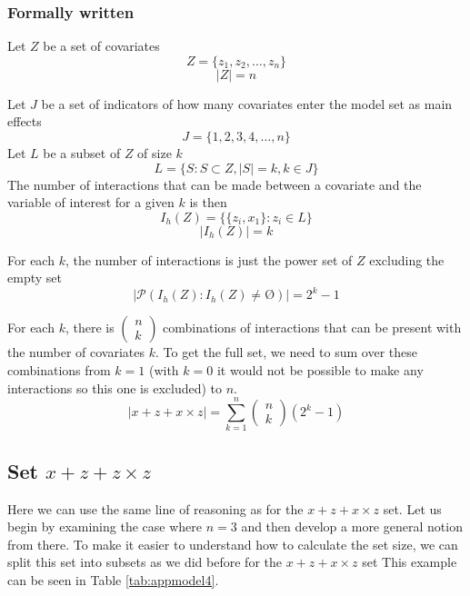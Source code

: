 \subsubsection{Formally written}
Let $Z$ be a set of covariates 
\[Z=\{\left.z_1,z_2,\dots ,z_n\right.\}\] \[|Z|=n\] 

Let $J$ be a set of indicators of how many covariates enter the model set as main effects
\[J=\{\left.1,2,3,4,\dots ,n\right.\}\] 
Let $L$ be a subset of $Z$ of size $k$
\[L=\{\left.S:S\subset Z,\left|S\right|=k,k\in J\right.\}\] 
The number of interactions that can be made between a covariate and the variable of interest for a given $k$ is then
\[I_h\left(Z\right)=\{\{\left.\left.z_i,x_1\right.\}:z_i\in L\right.\}\] 
\[\left|I_h\left(Z\right)\right|=k\] 

For each $k$, the number of interactions is just the power set of $Z$ excluding the empty set
\[\left|\mathcal{P}\left(I_h\left(Z\right):I_h\left(Z\right)\neq \textrm{\O}\right)\right|=2^k-1\] 

For each $k$, there is $\left( \begin{array}{c}
n \\ 
k \end{array}
\right)$ combinations of interactions that can be present with the number of covariates $k$. To get the full set, we need to sum over these combinations from $k=1$ (with $k=0$ it would not be possible to make any interactions so this one is excluded) to $n$.
\[\left|x + z + x \times z\right|=\sum^n_{k=1}{\left( \begin{array}{c}
n \\ 
k \end{array}
\right)\left(2^k-1\right)}\] 
\subsection{Set $x + z + z \times z$}

Here we can use the same line of reasoning as for the $x + z + x \times z$ set. Let us begin by examining the case where $n=3$ and then develop a more general notion from there. To make it easier to understand how to calculate the set size, we can split this set into subsets as we did before for the $x + z + x \times z$ set This example can be seen in Table \ref{tab:appmodel4}. 

